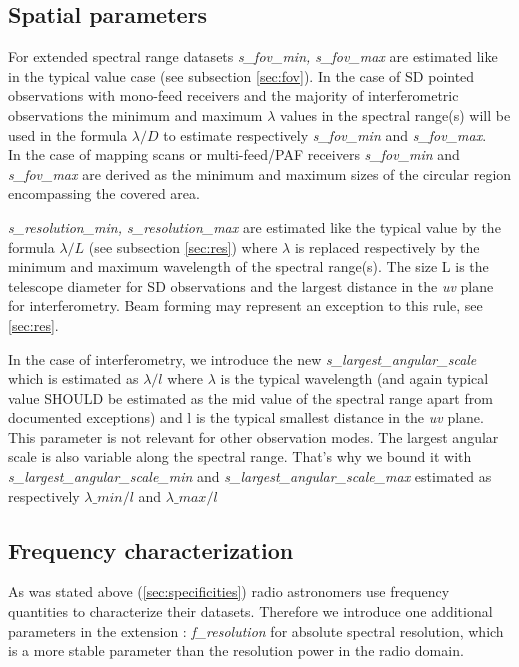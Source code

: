 \documentclass[11pt,a4paper]{ivoa}
\begin{document}
\subsection{Spatial parameters}

For extended spectral range datasets \emph{s\_fov\_min, s\_fov\_max} are estimated like in the typical value case (see subsection \ref{sec:fov}).  
In the case of SD pointed observations with mono-feed receivers and the majority of interferometric observations the minimum and maximum
$\lambda$ values in the spectral range(s) will be used in the formula  $\lambda / D$ to estimate respectively \emph{s\_fov\_min} and  \emph{s\_fov\_max}. \\
In the case of mapping scans or multi-feed/PAF receivers \emph{ s\_fov\_min} and \emph{s\_fov\_max} are derived as the minimum and maximum sizes of the 
circular region encompassing the covered area.


\emph{s\_resolution\_min, s\_resolution\_max} are estimated like the typical value by the formula  $\lambda / L$  (see subsection \ref{sec:res}) where $\lambda$ is replaced respectively by the minimum and maximum wavelength of the spectral range(s). The size L is the telescope diameter for SD observations and the largest distance in the \emph{uv} plane for interferometry. Beam forming may represent an exception to this rule, see \ref{sec:res}.

In the case of interferometry, we introduce the new \emph{s\_largest\_angular\_scale} which is estimated as $\lambda/l$ where $\lambda$ is the typical
wavelength (and again typical value SHOULD be estimated as the mid value of the spectral range apart from documented exceptions) and l is the typical smallest distance in the \emph{uv} plane. This parameter is not relevant for other observation modes.
The largest angular scale is also variable along the spectral range. That's why we bound it with \emph{s\_largest\_angular\_scale\_min} and \emph{s\_largest\_angular\_scale\_max} estimated as  respectively $\lambda\_min/l$ and  $\lambda\_max/l$



\subsection{Frequency characterization}

As was stated above (\ref{sec:specificities}) radio astronomers use frequency quantities to characterize their datasets. Therefore we introduce one additional parameters in the extension : 
\emph{f\_resolution} for absolute spectral resolution, which is a more stable parameter than the resolution power in the radio domain.
\end{document}
